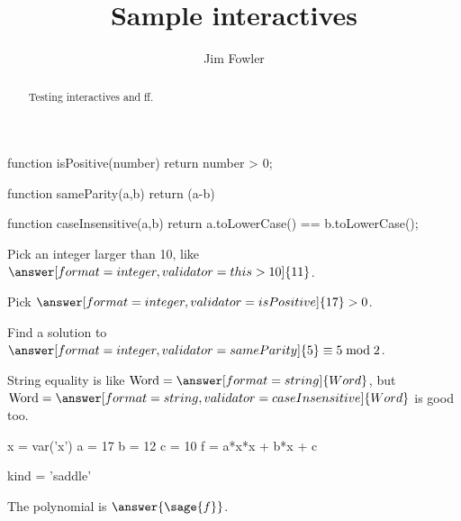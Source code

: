 \documentclass{ximera}
\title{Sample interactives}
\author{Jim Fowler}
\begin{document}
\begin{abstract}
Testing interactives and ff.
\end{abstract}
\maketitle

\begin{javascript}
  function isPositive(number) {
    return number > 0;
  }

  function sameParity(a,b) {
    return (a-b)%
  }

  function caseInsensitive(a,b) {
    return a.toLowerCase() == b.toLowerCase();
  }
\end{javascript}

\begin{problem}
  Pick an integer larger than 10, like $\answer[format=integer,validator=this>10]{11}$.

  Pick $\answer[format=integer,validator=isPositive]{17} > 0$.

  Find a solution to $\answer[format=integer,validator=sameParity]{5} \equiv 5 \bmod 2$.

  String equality is like $\mbox{Word} = \answer[format=string]{Word}$, but $\mbox{Word} = \answer[format=string,validator=caseInsensitive]{Word}$ is good too.
\end{problem}


\begin{sagesilent}
  x = var('x')
  a = 17
  b = 12
  c = 10
  f = a*x*x + b*x + c

  kind = 'saddle'
\end{sagesilent}

The polynomial is $\answer{\sage{f}}$.


\end{document}

